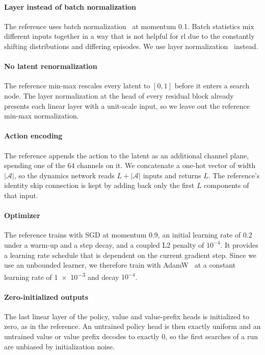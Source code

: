 \paragraph{Layer instead of batch normalization}
The reference uses batch normalization~\cite{ioffe_batch_2015} at momentum 0.1.
Batch statistics mix different inputs together in a way that is not helpful
for \gls{rl} due to the constantly shifting distributions and differing episodes.
We use layer normalization~\cite{ba_layer_2016} instead.

\paragraph{No latent renormalization}
The reference min-max rescales every latent to $[0,1]$ before it enters a search node.
The layer normalization at the head of every residual block already presents each linear layer with
a unit-scale input, so we leave out the reference min-max normalization.

\paragraph{Action encoding}
The reference appends the action to the latent as an additional channel plane, spending one of the
64 channels on it.
We concatenate a one-hot vector of width $|\mathcal{A}|$, so the dynamics network reads
$L+|\mathcal{A}|$ inputs and returns $L$.
The reference's identity skip connection is kept by adding back only the first $L$ components of that input.

\paragraph{Optimizer}
The reference trains with SGD at momentum 0.9, an initial learning rate of 0.2 under a warm-up and
a step decay, and a coupled L2 penalty of $10^{-4}$.
It provides a learning rate schedule that is dependent on the current gradient step.
Since we use an unbounded learner, we therefore train with AdamW~\cite{adamw} at a constant
learning rate of \num{1e-3} and decay $10^{-4}$.

\paragraph{Zero-initialized outputs}
The last linear layer of the policy, value and value-prefix heads is initialized to zero, as in the
reference.
An untrained policy head is then exactly uniform and an untrained value or value prefix decodes to
exactly $0$, so the first searches of a run are unbiased by initialization noise.

